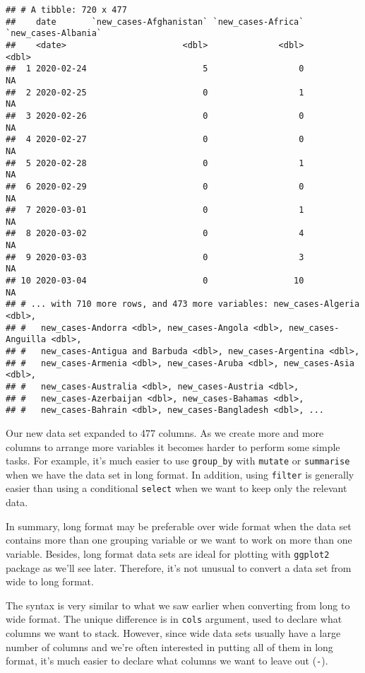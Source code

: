 \documentclass[
]{book}
\begin{document}
\begin{verbatim}
## # A tibble: 720 x 477
##    date       `new_cases-Afghanistan` `new_cases-Africa` `new_cases-Albania`
##    <date>                       <dbl>              <dbl>               <dbl>
##  1 2020-02-24                       5                  0                  NA
##  2 2020-02-25                       0                  1                  NA
##  3 2020-02-26                       0                  0                  NA
##  4 2020-02-27                       0                  0                  NA
##  5 2020-02-28                       0                  1                  NA
##  6 2020-02-29                       0                  0                  NA
##  7 2020-03-01                       0                  1                  NA
##  8 2020-03-02                       0                  4                  NA
##  9 2020-03-03                       0                  3                  NA
## 10 2020-03-04                       0                 10                  NA
## # ... with 710 more rows, and 473 more variables: new_cases-Algeria <dbl>,
## #   new_cases-Andorra <dbl>, new_cases-Angola <dbl>, new_cases-Anguilla <dbl>,
## #   new_cases-Antigua and Barbuda <dbl>, new_cases-Argentina <dbl>,
## #   new_cases-Armenia <dbl>, new_cases-Aruba <dbl>, new_cases-Asia <dbl>,
## #   new_cases-Australia <dbl>, new_cases-Austria <dbl>,
## #   new_cases-Azerbaijan <dbl>, new_cases-Bahamas <dbl>,
## #   new_cases-Bahrain <dbl>, new_cases-Bangladesh <dbl>, ...
\end{verbatim}

Our new data set expanded to 477 columns. As we create more and more columns to arrange more variables it becomes harder to perform some simple tasks. For example, it's much easier to use \texttt{group\_by} with \texttt{mutate} or \texttt{summarise} when we have the data set in long format. In addition, using \texttt{filter} is generally easier than using a conditional \texttt{select} when we want to keep only the relevant data.

In summary, long format may be preferable over wide format when the data set contains more than one grouping variable or we want to work on more than one variable. Besides, long format data sets are ideal for plotting with \texttt{ggplot2} package as we'll see later. Therefore, it's not unusual to convert a data set from wide to long format.

The syntax is very similar to what we saw earlier when converting from long to wide format. The unique difference is in \texttt{cols} argument, used to declare what columns we want to stack. However, since wide data sets usually have a large number of columns and we're often interested in putting all of them in long format, it's much easier to declare what columns we want to leave out (\texttt{-}).
\end{document}
